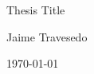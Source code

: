 \documentclass[12pt,a4paper]{report} %
\begin{document}
\begin{titlepage}
    \centering
    {\Huge Thesis Title \par}
    \vspace{2cm}
    {\Large Jaime Travesedo \par}
    \vfill
    {\large \today \par}
\end{titlepage}

\tableofcontents
\listoffigures
\listoftables








\end{document}
